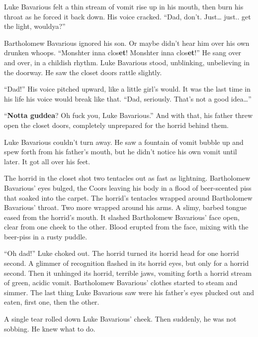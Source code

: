 Luke Bavarious felt a thin stream of vomit rise up in his mouth,
then burn his throat as he forced it back down. His voice cracked.
``Dad, don't. Just{\ldots} just.. get the light,
wouldya?''



Bartholomew Bavarious ignored his son. Or maybe didn't hear him over his
own drunken whoops. ``Monshter inna clos{\bf et}!  Monshter inna
clos{\bf et}!'' He sang over and over, in a childish rhythm. Luke
Bavarious stood, unblinking, unbelieving in the doorway. He saw the
closet doors rattle slightly.



``Dad!'' His voice pitched upward, like a little
girl's would. It was the last time in his life his voice
would break like that. ``Dad, seriously. That's not a
good idea{\ldots}''



``{\bf Notta guddea}? Oh fuck you, Luke Bavarious.'' And with
that, his father threw open the closet doors, completely unprepared
for the horrid behind them.



Luke Bavarious couldn't turn away. He saw a fountain of vomit
bubble up and spew forth from his father's mouth, but he
didn't notice his own vomit until later. It got all over his
feet.



The horrid in the closet shot two tentacles out as fast as
lightning. Bartholomew Bavarious' eyes bulged, the Coors
leaving his body in a flood of beer-scented piss that soaked into
the carpet. The horrid's tentacles wrapped around Bar\-thol\-omew
Bavarious' throat. Two more wrapped around his arms. A slimy,
barbed tongue eased from the horrid's mouth. It slashed
Bartholomew Bavarious' face open, clear from one cheek to the
other. Blood erupted from the face, mixing with the beer-piss in a
rusty puddle.



``Oh dad!'' Luke choked out. The horrid turned its horrid
head for one horrid second. A glimmer of recognition flashed in its
horrid eyes, but only for a horrid second. Then it unhinged its
horrid, terrible jaws, vomiting forth a horrid stream of green,
acidic vomit. Bartholomew Bavarious' clothes started to steam
and simmer. The last thing Luke Bavarious saw were his
father's eyes plucked out and eaten, first one, then the
other.



A single tear rolled down Luke Bavarious' cheek. Then
suddenly, he was not sobbing. He knew what to do.



